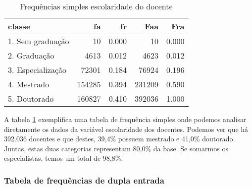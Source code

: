 \documentclass[11pt,]{style/krantz}
\makeatletter
\newenvironment{Shaded}{\begin{snugshade}}{\end{snugshade}}
\newcommand{\DataTypeTok}[1]{\textcolor[rgb]{0.13,0.29,0.53}{#1}}
\newcommand{\DecValTok}[1]{\textcolor[rgb]{0.00,0.00,0.81}{#1}}
\newcommand{\KeywordTok}[1]{\textcolor[rgb]{0.13,0.29,0.53}{\textbf{#1}}}
\newcommand{\NormalTok}[1]{#1}
\newcommand{\OperatorTok}[1]{\textcolor[rgb]{0.81,0.36,0.00}{\textbf{#1}}}
\newcommand{\OtherTok}[1]{\textcolor[rgb]{0.56,0.35,0.01}{#1}}
\newcommand{\StringTok}[1]{\textcolor[rgb]{0.31,0.60,0.02}{#1}}
\newenvironment{kframe}{%
\medskip{}
\setlength{\fboxsep}{.8em}
 \def\at@end@of@kframe{}%
 \ifinner\ifhmode%
  \def\at@end@of@kframe{\end{minipage}}%
  \begin{minipage}{\columnwidth}%
 \fi\fi%
 \def\FrameCommand##1{\hskip\@totalleftmargin \hskip-\fboxsep
 \colorbox{shadecolor}{##1}\hskip-\fboxsep
     \hskip-\linewidth \hskip-\@totalleftmargin \hskip\columnwidth}%
 \MakeFramed {\advance\hsize-\width
   \@totalleftmargin\z@ \linewidth\hsize
   \@setminipage}}%
 {\par\unskip\endMakeFramed%
 \at@end@of@kframe}
\renewenvironment{Shaded}{\begin{kframe}}{\end{kframe}}
\theoremstyle{definition}
\theoremstyle{definition}
\theoremstyle{definition}
\theoremstyle{remark}
\makeatother
\begin{document}
\begin{Shaded}
\end{Shaded}

\begin{table}[!h]

\caption{\label{tab:tab04}Frequências simples escolaridade do docente}
\centering
\begin{tabular}{lrrrr}
\toprule
classe & fa & fr & Faa & Fra\\
\midrule
1. Sem graduação & 10 & 0.000 & 10 & 0.000\\
2. Graduação & 4613 & 0.012 & 4623 & 0.012\\
3. Especialização & 72301 & 0.184 & 76924 & 0.196\\
4. Mestrado & 154285 & 0.394 & 231209 & 0.590\\
5. Doutorado & 160827 & 0.410 & 392036 & 1.000\\
\bottomrule
\end{tabular}
\end{table}

A tabela \ref{tab:tab04} exemplifica uma tabela de frequência simples onde podemos analisar diretamente os dados da variável escolaridade dos docentes. Podemos ver que há 392.036 docentes e que destes, 39,4\% possuem mestrado e 41,0\% doutorado. Juntas, estas duas categorias representam 80,0\% da base. Se somarmos os especialistas, temos um total de 98,8\%.

\hypertarget{tabela-de-frequencias-de-dupla-entrada}{%
\subsubsection{Tabela de frequências de dupla entrada}\label{tabela-de-frequencias-de-dupla-entrada}}
\end{document}
